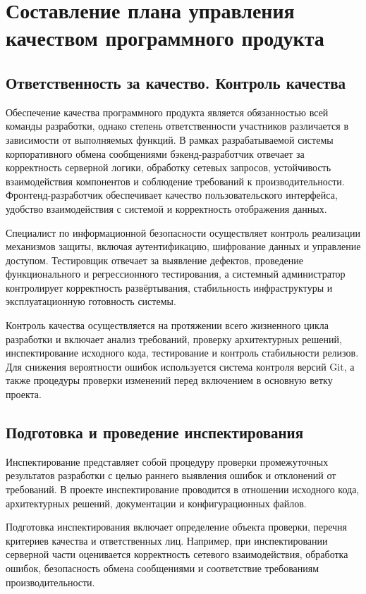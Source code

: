 \documentclass[14pt,a4paper]{extarticle}
\begin{document}
\section{Составление плана управления качеством программного продукта}

\subsection{Ответственность за качество. Контроль качества}

Обеспечение качества программного продукта является обязанностью всей команды разработки, однако степень ответственности участников различается в зависимости от выполняемых функций. В рамках разрабатываемой системы корпоративного обмена сообщениями бэкенд-разработчик отвечает за корректность серверной логики, обработку сетевых запросов, устойчивость взаимодействия компонентов и соблюдение требований к производительности. Фронтенд-разработчик обеспечивает качество пользовательского интерфейса, удобство взаимодействия с системой и корректность отображения данных.

Специалист по информационной безопасности осуществляет контроль реализации механизмов защиты, включая аутентификацию, шифрование данных и управление доступом. Тестировщик отвечает за выявление дефектов, проведение функционального и регрессионного тестирования, а системный администратор контролирует корректность развёртывания, стабильность инфраструктуры и эксплуатационную готовность системы.

Контроль качества осуществляется на протяжении всего жизненного цикла разработки и включает анализ требований, проверку архитектурных решений, инспектирование исходного кода, тестирование и контроль стабильности релизов. Для снижения вероятности ошибок используется система контроля версий Git, а также процедуры проверки изменений перед включением в основную ветку проекта.

\subsection{Подготовка и проведение инспектирования}

Инспектирование представляет собой процедуру проверки промежуточных результатов разработки с целью раннего выявления ошибок и отклонений от требований. В проекте инспектирование проводится в отношении исходного кода, архитектурных решений, документации и конфигурационных файлов.

Подготовка инспектирования включает определение объекта проверки, перечня критериев качества и ответственных лиц. Например, при инспектировании серверной части оценивается корректность сетевого взаимодействия, обработка ошибок, безопасность обмена сообщениями и соответствие требованиям производительности.
\end{document}
